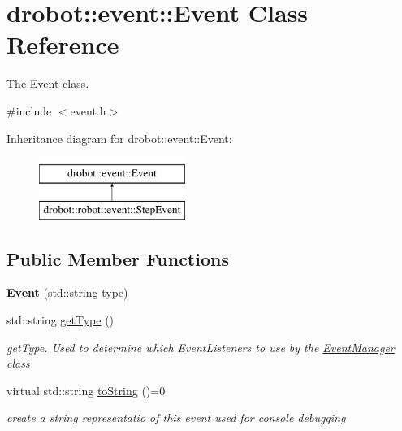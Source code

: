 \hypertarget{classdrobot_1_1event_1_1Event}{\section{drobot\-:\-:event\-:\-:Event Class Reference}
\label{classdrobot_1_1event_1_1Event}
}


The \hyperlink{classdrobot_1_1event_1_1Event}{Event} class.  




{\ttfamily \#include $<$event.\-h$>$}

Inheritance diagram for drobot\-:\-:event\-:\-:Event\-:\begin{figure}[H]
\begin{center}
\leavevmode
\includegraphics[height=2.000000cm]{classdrobot_1_1event_1_1Event}
\end{center}
\end{figure}
\subsection*{Public Member Functions}
\begin{DoxyCompactItemize}
\item 
\hypertarget{classdrobot_1_1event_1_1Event_af80625172e5af3af44f7e9c760f99969}{{\bfseries Event} (std\-::string type)}\label{classdrobot_1_1event_1_1Event_af80625172e5af3af44f7e9c760f99969}

\item 
std\-::string \hyperlink{classdrobot_1_1event_1_1Event_ab68894db84882d95424818d6bc4b36d4}{get\-Type} ()
\begin{DoxyCompactList}\small\item\em get\-Type. Used to determine which Event\-Listeners to use by the \hyperlink{classdrobot_1_1event_1_1EventManager}{Event\-Manager} class \end{DoxyCompactList}\item 
virtual std\-::string \hyperlink{classdrobot_1_1event_1_1Event_a25b725cbb7dbdb4a41b9c4e9fc3785d8}{to\-String} ()=0
\begin{DoxyCompactList}\small\item\em create a string representatio of this event used for console debugging \end{DoxyCompactList}\end{DoxyCompactItemize}
